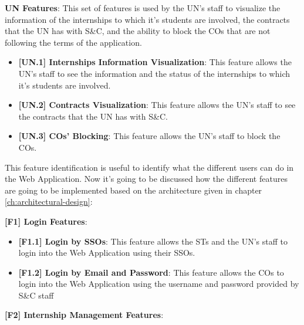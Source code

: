 \par \textbf{UN Features}: This set of features is used by the UN's staff to visualize the information of the
internships to which it's students are involved, the contracts that the UN has with S\&C, and the ability to block the
COs that are not following the terms of the application.

\begin{itemize}
    \item \textbf{[UN.1] Internships Information Visualization}: This feature allows the UN's staff to see the
          information and the status of the internships to which it's students are involved.
    \item \textbf{[UN.2] Contracts Visualization}: This feature allows the UN's staff to see the contracts that the UN
          has with S\&C.
    \item \textbf{[UN.3] COs' Blocking}: This feature allows the UN's staff to block the COs.
\end{itemize}


\par This feature identification is useful to identify what the different users can do in the Web Application. 
Now it's going to be discussed how the different features are going to be implemented based on the architecture given in
chapter \ref{ch:architectural-design}:

\par \textbf{[F1] Login Features}: 

\begin{itemize}
    \item \textbf{[F1.1] Login by SSOs}: This feature allows the STs and the UN's staff to login into the Web Application
          using their SSOs.
    \item \textbf{[F1.2] Login by Email and Password}: This feature allows the COs to login into the Web Application
          using the username and password provided by S\&C staff
\end{itemize}

\par \textbf{[F2] Internship Management Features}:

